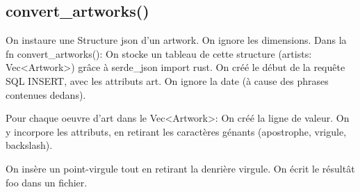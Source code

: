 \documentclass{article}
\begin{document}
\clearpage

\subsection{convert\_artworks()}
\label{sec:convArtworks}

On instaure une Structure json d'un artwork.
On ignore les dimensions.
Dans la fn convert\_artworks(): 
On stocke un tableau de cette structure (artists: Vec<Artwork>) grâce à serde\_json import rust.
On créé le début de la requête SQL INSERT, avec les attributs art.
On ignore la date (à cause des phrases contenues dedans).

Pour chaque oeuvre d'art dans le Vec<Artwork>: \newline
On créé la ligne de valeur.
On y incorpore les attributs, en retirant les caractères génants (apostrophe, vrigule, backslash).

On insère un point-virgule tout en retirant la denrière virgule.
On écrit le résultât foo dans un fichier.
\end{document}
